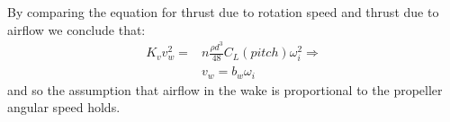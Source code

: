By comparing the equation for thrust due to rotation speed and thrust due to airflow we conclude that:
\begin{equation} \begin{split}
	K_v v_w^2 =& n \frac{\rho d^3}{48} C_L(pitch) \omega_i^2 \Rightarrow \\
	& v_w = b_w \omega_i
\end{split}\end{equation}
and so the assumption that airflow in the wake is proportional to the propeller angular speed holds.

